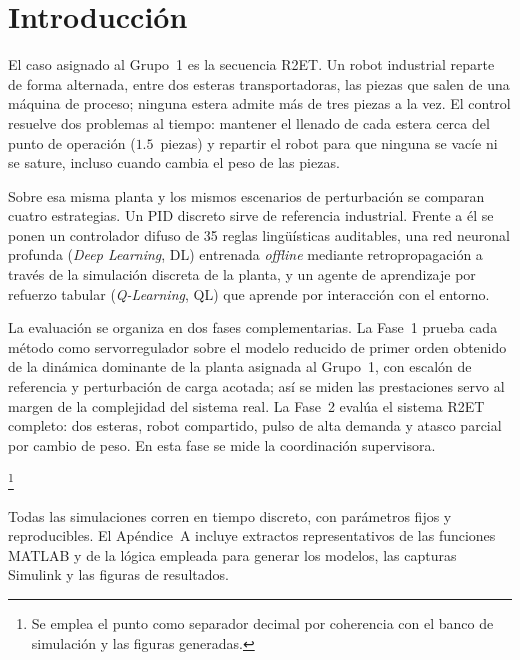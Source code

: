 \chapter{Introducción}
\label{ch:intro}

El caso asignado al Grupo~1 es la secuencia R2ET. Un robot industrial reparte de forma alternada, entre dos esteras transportadoras, las piezas que salen de una máquina de proceso; ninguna estera admite más de tres piezas a la vez. El control resuelve dos problemas al tiempo: mantener el llenado de cada estera cerca del punto de operación ($1.5$~piezas) y repartir el robot para que ninguna se vacíe ni se sature, incluso cuando cambia el peso de las piezas.

Sobre esa misma planta y los mismos escenarios de perturbación se comparan cuatro estrategias. Un PID discreto sirve de referencia industrial. Frente a él se ponen un controlador difuso de 35 reglas lingüísticas auditables, una red neuronal profunda (\emph{Deep Learning}, DL) entrenada \emph{offline} mediante retropropagación a través de la simulación discreta de la planta, y un agente de aprendizaje por refuerzo tabular (\emph{Q-Learning}, QL) que aprende por interacción con el entorno.

La evaluación se organiza en dos fases complementarias. La Fase~1 prueba cada método como servorregulador sobre el modelo reducido de primer orden obtenido de la dinámica dominante de la planta asignada al Grupo~1, con escalón de referencia y perturbación de carga acotada; así se miden las prestaciones servo al margen de la complejidad del sistema real. La Fase~2 evalúa el sistema R2ET completo: dos esteras, robot compartido, pulso de alta demanda y atasco parcial por cambio de peso. En esta fase se mide la coordinación supervisora.

\footnote{Se emplea el punto como separador decimal por coherencia con el banco de simulación y las figuras generadas.}

Todas las simulaciones corren en tiempo discreto, con parámetros fijos y reproducibles. El Apéndice~A incluye extractos representativos de las funciones MATLAB y de la lógica empleada para generar los modelos, las capturas Simulink y las figuras de resultados.
